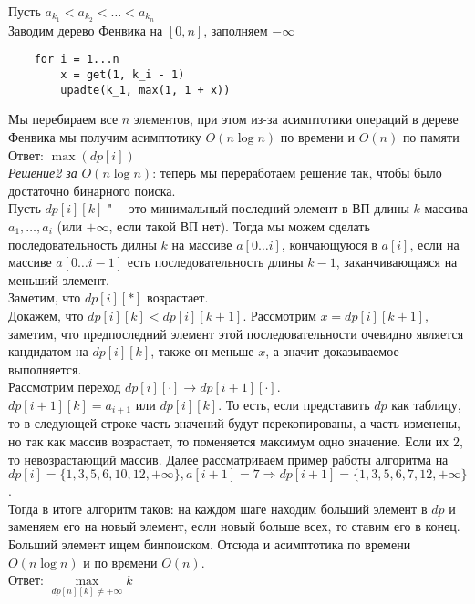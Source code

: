 \documentclass[a4paper, 12pt]{article}
\theoremstyle{plain}
\theoremstyle{definition}
\theoremstyle{remark}
\begin{document}
Пусть $a_{k_1}<a_{k_2}<\dots<a_{k_n}$\\
Заводим дерево Фенвика на $[0,n]$, заполняем $-\infty$\\
\begin{verbatim}
	for i = 1...n
	    x = get(1, k_i - 1)
	    upadte(k_1, max(1, 1 + x))
\end{verbatim}
Мы перебираем все $n$ элементов, при этом из-за асимптотики операций в дереве Фенвика мы получим асимптотику $O(n\log n)$ по времени и $O(n)$ по памяти\\
Ответ: $\max(dp[i])$\\
\textit{Решение2 за} $O(n\log n)$: теперь мы переработаем решение так, чтобы было достаточно бинарного поиска.\\
Пусть $dp[i][k]$ "--- это минимальный последний элемент в ВП длины $k$ массива $a_1,\dots,a_i$ (или $+\infty$, если такой ВП нет). Тогда мы можем сделать последовательность дилны $k$ на массиве $a[0\dots i]$, кончающуюся в $a[i]$, если на массиве $a[0\dots i-1]$ есть последовательность длины $k-1$, заканчивающаяся на меньший элемент.\\
Заметим, что $dp[i][*]$ возрастает.\\
Докажем, что $dp[i][k]<dp[i][k+1]$. Рассмотрим $x=dp[i][k+1]$, заметим, что предпоследний элемент этой последовательности очевидно является кандидатом на $dp[i][k]$, также он меньше $x$, а значит доказываемое выполняется.\\
Рассмотрим переход $dp[i][\cdot]\to dp[i+1][\cdot]$.\\
$dp[i+1][k] = a_{i+1} \text{ или } dp[i][k]$. То есть, если представить $dp$ как таблицу, то в следующей строке часть значений будут перекопированы, а часть изменены, но так как массив возрастает, то поменяется максимум одно значение. Если их $2$, то невозрастающий массив. Далее рассматриваем пример работы алгоритма на  $dp[i]=\{1,3,5,6,10,12, +\infty\}, a[i+1]=7\Rightarrow dp[i+1]=\{1,3,5,6,7,12,+\infty\}$.\\
Тогда в итоге алгоритм таков: на каждом шаге находим больший элемент в $dp$ и заменяем его на новый элемент, если новый больше всех, то ставим его в конец. Больший элемент ищем бинпоиском. Отсюда и асимптотика по времени $O(n\log n)$ и по времени $O(n)$.\\
Ответ: $\max\limits_{dp[n][k]\not=+\infty}k$
\end{document}
